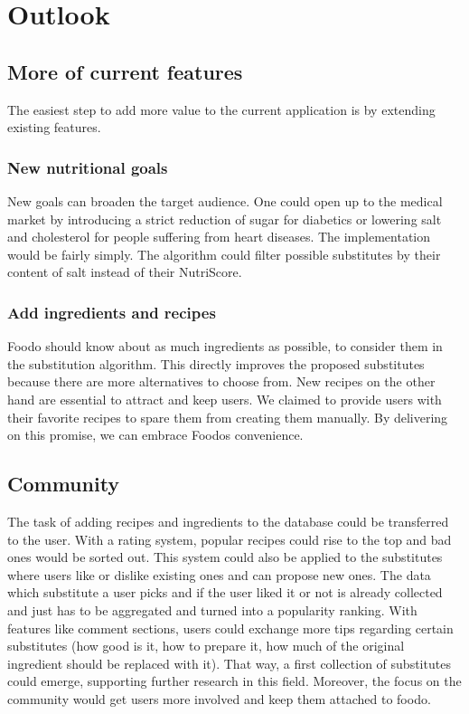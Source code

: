 \chapter{Outlook}

\section*{More of current features}
The easiest step to add more value to the current application is by extending existing features.

\subsection*{New nutritional goals}
New goals can broaden the target audience. One could open up to the medical market by introducing a strict reduction of sugar for diabetics or lowering salt and cholesterol for people suffering from heart diseases. The implementation would be fairly simply. The algorithm could filter possible substitutes by their content of salt instead of their NutriScore.

\subsection*{Add ingredients and recipes}
Foodo should know about as much ingredients as possible, to consider them in the substitution algorithm. This directly improves the proposed substitutes because there are more alternatives to choose from. New recipes on the other hand are essential to attract and keep users. We claimed to provide users with their favorite recipes to spare them from creating them manually. By delivering on this promise, we can embrace Foodos convenience.

\section*{Community}
The task of adding recipes and ingredients to the database could be transferred to the user.
With a rating system, popular recipes could rise to the top and bad ones would be sorted out. This system could also be applied to the substitutes where users like or dislike existing ones and can propose new ones. The data which substitute a user picks and if the user liked it or not is already collected and just has to be aggregated and turned into a popularity ranking.
With features like comment sections, users could exchange more tips regarding certain substitutes (how good is it, how to prepare it, how much of the original ingredient should be replaced with it). That way, a first collection of substitutes could emerge, supporting further research in this field. Moreover, the focus on the community would get users more involved and keep them attached to foodo.

